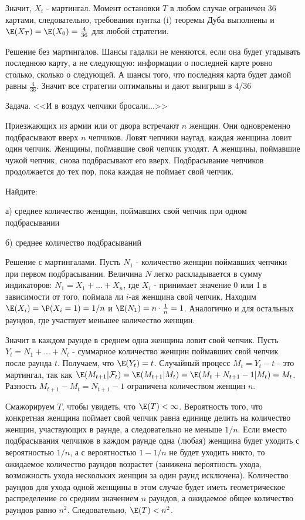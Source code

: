 {Значит, $X_{t}$ - мартингал. Момент остановки $T$ в любом случае ограничен 36 картами, следовательно, требования пунтка (i) теоремы Дуба выполнены и $\E(X_{T})=\E(X_{0})=\frac{4}{36}$ для любой стратегии.

Решение без мартингалов. Шансы гадалки не меняются, если она будет угадывать последнюю карту, а не следующую: информации о последней карте ровно столько, сколько о следующей. А шансы того, что последняя карта будет дамой равны $\frac{4}{36}$.
Значит все стратегии оптимальны и дают выигрыш в $4/36$

Задача. <<И в воздух чепчики бросали...>> %

Приезжающих из армии или от двора встречают $n$ женщин. Они
одновременно подбрасывают вверх $n$ чепчиков. Ловят чепчики
наугад, каждая женщина ловит один чепчик.
Женщины, поймавшие свой чепчик уходят. А женщины,
поймавшие чужой чепчик, снова подбрасывают его вверх.
Подбрасывание чепчиков продолжается до тех пор, пока каждая не
поймает свой чепчик. 

Найдите:

а) среднее количество женщин, поймавших свой чепчик при одном подбрасывании

б) среднее количество подбрасываний 

Решение с мартингалами. Пусть $N_{1}$ - количество женщин поймавших чепчики при первом подбрасывании. Величина $N$ легко раскладывается в сумму индикаторов: $N_{1}=X_{1}+...+X_{n}$, где $X_{i}$ - принимает значение 0 или 1 в зависимости от того, поймала ли $i$-ая женщина свой чепчик. Находим $\E(X_{i})=\P(X_{i}=1)=1/n$ и $\E(N_{1})=n\cdot \frac{1}{n}=1$. Аналогично и для остальных раундов, где участвует меньшее количество женщин.

Значит в каждом раунде в среднем одна женщина ловит свой чепчик. Пусть $Y_{t}=N_{1}+...+N_{t}$ - суммарное количество женщин поймавших свой чепчик после раунда $t$. Получаем, что $\E(Y_{t})=t$. Случайный процесс $M_{t}=Y_{t}-t$ - это мартингал, так как $\E(M_{t+1}|\mathcal{F}_{t})=\E(M_{t+1}|M_{t})=\E(M_{t}+N_{t+1}-1|M_{t})=M_{t}$. Разность $M_{t+1}-M_{t}=N_{t+1}-1$ ограничена количеством женщин $n$.

Смажорируем $T$, чтобы увидеть, что $\E(T)<\infty$. Вероятность того, что конкретная женщина поймает свой чепчик равна единице делить на количество женщин, участвующих в раунде, а следовательно не меньше $1/n$. Если вместо подбрасывания чепчиков в каждом раунде одна (любая) женщина будет уходить с вероятностью $1/n$, а с вероятностью $1-1/n$ не будет уходить никто, то ожидаемое количество раундов возрастет (занижена вероятность ухода, возможность ухода нескольких женщин за один раунд исключена). Количество раундов для ухода одной женщины в этом случае будет иметь геометрическое распределение со средним значением $n$ раундов, а ожидаемое общее количество раундов равно $n^{2}$. Следовательно, $\E(T)<n^{2}$.

}

